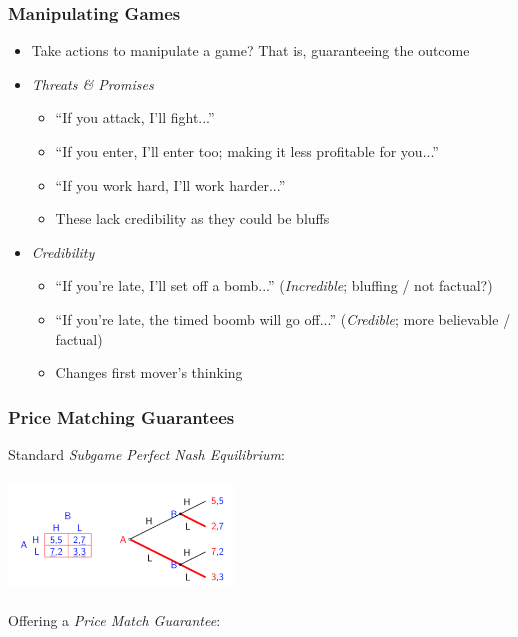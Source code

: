 \documentclass[11pt, english]{article}
\begin{document}
		\subsubsection{Manipulating Games}

	\begin{itemize}
	\setlength\itemsep{0cm}
		\item Take actions to manipulate a game? That is, guaranteeing the outcome
		\item \textit{Threats \& Promises}
		\begin{itemize}
			\item ``If you attack, I'll fight...''
			\item ``If you enter, I'll enter too; making it less profitable for you...''
			\item ``If you work hard, I'll work harder...''
			\item These lack credibility as they could be bluffs
		\end{itemize}
		\item \textit{Credibility}
		\begin{itemize}
			\item ``If you're late, I'll set off a bomb...'' (\textit{Incredible}; bluffing / not factual?)
			\item ``If you're late, the timed boomb will go off...'' (\textit{Credible}; more believable / factual)
			\item Changes first mover's thinking
		\end{itemize}
	\end{itemize}

		\subsubsection{Price Matching Guarantees}
	
	Standard \textit{Subgame Perfect Nash Equilibrium}:

	\begin{center}
		\includegraphics[width=6cm,height=3cm]{EC315-IMG/4.png}
	\end{center}

	Offering a \textit{Price Match Guarantee}:
\end{document}
